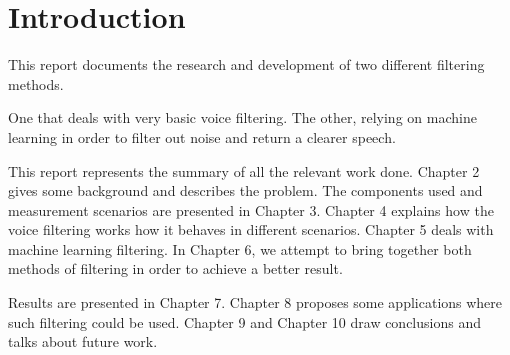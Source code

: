 \chapter{Introduction}\label{ch:introduction}
This report documents the research and development of two different filtering
methods.

One that deals with very basic voice filtering. The other, relying on machine 
learning in order to filter out noise and return a clearer speech.

This report represents the summary of all the relevant work done.
Chapter 2 gives some background and describes the problem. 
The components used and measurement scenarios are presented in Chapter 3. 
Chapter 4 explains how the voice filtering works how it behaves in different 
scenarios. Chapter 5 deals with machine learning filtering. In Chapter 6, we 
attempt to bring together both methods of filtering in order to achieve a 
better result.

Results are presented in Chapter 7. Chapter 8 proposes some applications where
such filtering could be used. Chapter 9 and Chapter 10 draw conclusions and 
talks about future work.
